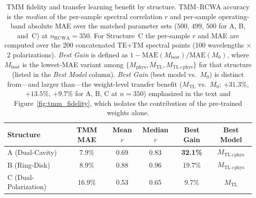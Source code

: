 \documentclass[a4paper,fleqn]{cas-sc}
\newcommand{\Mzero}{M_0}
\newcommand{\Mphys}{M_\text{phys}}
\newcommand{\Mtl}{M_\text{TL}}
\newcommand{\Mtlphys}{M_\text{TL+phys}}
\begin{document}
\begin{table}[htbp]\centering\small
\caption{TMM fidelity and transfer learning benefit by structure. TMM--RCWA accuracy is the \emph{median} of the per-sample spectral correlation $r$ and per-sample operating-band absolute MAE over the matched parameter sets ($500$, $499$, $500$ for A, B, and~C) at $n_\text{RCWA}=350$. For Structure~C the per-sample $r$ and MAE are computed over the 200 concatenated TE+TM spectral points (100 wavelengths $\times$ 2 polarizations). \textit{Best Gain} is defined as $1 - \mathrm{MAE}(M_\text{best})/\mathrm{MAE}(\Mzero)$, where $M_\text{best}$ is the lowest-MAE variant among $\{\Mphys, \Mtl, \Mtlphys\}$ for that structure (listed in the \textit{Best Model} column). \textit{Best Gain} (best model vs.\ $\Mzero$) is distinct from---and larger than---the weight-level transfer benefit ($\Mtl$ vs.\ $\Mzero$; $+31.3\%$, $+13.5\%$, $+9.7\%$ for A, B, C at $n=350$) emphasized in the text and Figure~\ref{fig:tmm_fidelity}, which isolates the contribution of the pre-trained weights alone.}
\label{tab:tmm_fidelity}
\begin{tabular}{lccccc}\toprule
\textbf{Structure} & \textbf{TMM MAE} & \textbf{Mean $r$} & \textbf{Median $r$} & \textbf{Best Gain} & \textbf{Best Model}\\\midrule
A (Dual-Cavity)       & 7.9\% & 0.69 & 0.83 & \textbf{32.1\%} & $\Mtlphys$\\
B (Ring-Disk)         & 8.9\% & 0.88 & 0.96 & 19.7\% & $\Mtlphys$\\
C (Dual-Polarization) & 16.9\% & 0.53 & 0.65 & 9.7\% & $\Mtl$\\\bottomrule
\end{tabular}
\end{table}
\end{document}

